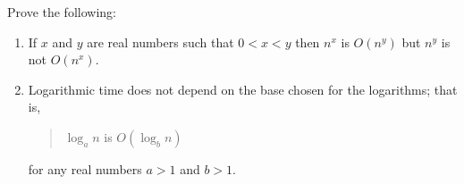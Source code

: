 Prove the following:
\begin{enumerate}
\item  If $x$ and $y$ are real numbers such that $0< x<y$ then $n^x$ is
  $O(n^y)$ but $n^y$ is not $O(n^x)$.
\item  Logarithmic time does not depend on the base chosen for the
  logarithms; that is,
\begin{quote}
$\log_a  n$ is $O(\log_b  n)$
\end{quote} 
for any real numbers $a >1$ and $b>1$.
\end{enumerate}
